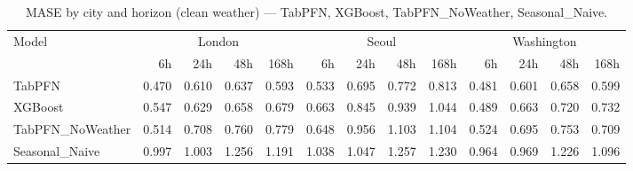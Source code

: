 \begin{table}[ht!]
\centering
\caption{MASE by city and horizon (clean weather) — TabPFN, XGBoost, TabPFN\_NoWeather, Seasonal\_Naive.}
\label{tab:task4_mase_by_city_horizon}
{\small
\setlength{\tabcolsep}{3pt}
\scriptsize
\begin{tabular}{lrrrrrrrrrrrr}
\toprule
Model & \multicolumn{4}{c}{London} & \multicolumn{4}{c}{Seoul} & \multicolumn{4}{c}{Washington} \\
  & 6h & 24h & 48h & 168h & 6h & 24h & 48h & 168h & 6h & 24h & 48h & 168h \\
\midrule
TabPFN & 0.470 & 0.610 & 0.637 & 0.593 & 0.533 & 0.695 & 0.772 & 0.813 & 0.481 & 0.601 & 0.658 & 0.599 \\
XGBoost & 0.547 & 0.629 & 0.658 & 0.679 & 0.663 & 0.845 & 0.939 & 1.044 & 0.489 & 0.663 & 0.720 & 0.732 \\
TabPFN\_NoWeather & 0.514 & 0.708 & 0.760 & 0.779 & 0.648 & 0.956 & 1.103 & 1.104 & 0.524 & 0.695 & 0.753 & 0.709 \\
Seasonal\_Naive & 0.997 & 1.003 & 1.256 & 1.191 & 1.038 & 1.047 & 1.257 & 1.230 & 0.964 & 0.969 & 1.226 & 1.096 \\
\bottomrule
\end{tabular}
}
\end{table}
